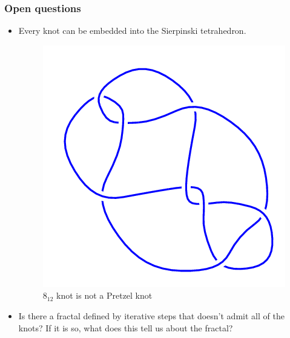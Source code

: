 \begin{frame}
	\frametitle{Open questions \cite{broden2024knotsinsidefractals}}
	\begin{itemize}
		\item Every knot can be embedded into the Sierpinski tetrahedron.
		\onslide<2->
		\begin{figure}[h]
			\centering
			\includegraphics[width=0.25\linewidth]{images/8_12}
			\caption{$8_{12}$ knot is not a Pretzel knot \cite{knotinfo}}\label{Fig:8_12}
		\end{figure}
		\item Is there a fractal defined by iterative steps that doesn't admit all of the knots? If it is so, what does this tell us about the fractal?
	\end{itemize}
\end{frame}